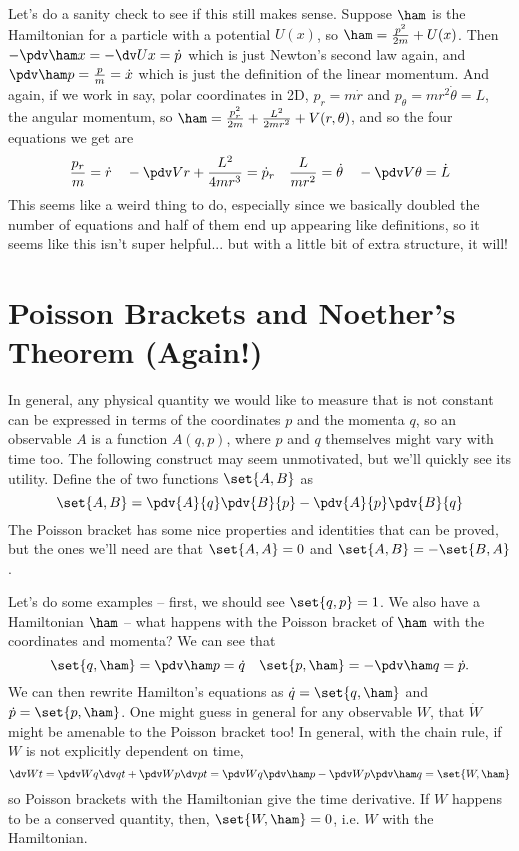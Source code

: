\documentclass[12pt]{article}
\begin{document}
Let's do a sanity check to see if this still makes sense. Suppose $\ham$ is the
Hamiltonian for a particle with a potential $U(x)$, so $\ham = \frac{p^2}{2m} +
U(x)$. Then $-\pdv \ham x = - \dv U x = \dot p$ which is just Newton's second
law again, and $\pdv \ham p = \frac{p}{m} = \dot x$ which is just the definition
of the linear momentum. And again, if we work in say, polar coordinates in 2D,
$p_r = m \dot r$ and $p_\theta = mr^2 \dot \theta = L$, the angular momentum, so
$\ham = \frac{p_r^2}{2m} + \frac{L^2}{2mr^2} + V(r, \theta)$, and so the four
equations we get are
\[
  \frac{p_r}{m} = \dot r \quad -\pdv V r + \frac{L^2}{4mr^3} = \dot p_r \quad
  \frac{L}{mr^2} = \dot \theta \quad - \pdv V \theta = \dot L   
\] 
This seems like a weird thing to do, especially since we basically doubled the
number of equations and half of them end up appearing like definitions, so it
seems like this isn't super helpful... but with a little bit of extra structure,
it will!

\section{Poisson Brackets and Noether's Theorem (Again!)}
In general, any physical quantity we would like to measure that is not constant
can be expressed in terms of the coordinates $p$ and the momenta $q$, so an
observable $A$ is a function $A(q, p)$, where $p$ and $q$ themselves might vary
with time too. The following construct may seem unmotivated, but we'll quickly
see its utility. Define the  of two functions $\set{A, B}$ as
\[
  \set{A, B} = \pdv{A}{q} \pdv{B}{p} - \pdv{A}{p} \pdv{B}{q}
\]
The Poisson bracket has some nice properties and identities that can be proved,
but the ones we'll need are that $\set{A, A} = 0$ and $\set{A, B} = - \set{B,
A}$.

Let's do some examples -- first, we should see $\set{q, p} = 1$. We also have a
Hamiltonian $\ham$ -- what happens with the Poisson bracket of $\ham$ with the
coordinates and momenta? We can see that 
\[
  \set{q, \ham} = \pdv \ham p = \dot q \quad \set{p, \ham} = - \pdv \ham q =
  \dot p.
\] 
We can then rewrite Hamilton's equations as $\dot q = \set{q, \ham}$ and $\dot p
= \set{p, \ham}$. One might guess in general for any observable $W$, that $\dot
W$ might be amenable to the Poisson bracket too! In general, with the chain
rule, if $W$ is not explicitly dependent on time, 
\[
 \dv W t = \pdv W q \dv q t + \pdv W p \dv p t = \pdv W q \pdv \ham p - \pdv W p
 \pdv \ham q = \set{W, \ham}
\] 
so Poisson brackets with the Hamiltonian give the time derivative. If $W$
happens to be a conserved quantity, then, $\set{W, \ham} = 0$, i.e. $W$
 with the Hamiltonian.
\end{document}
